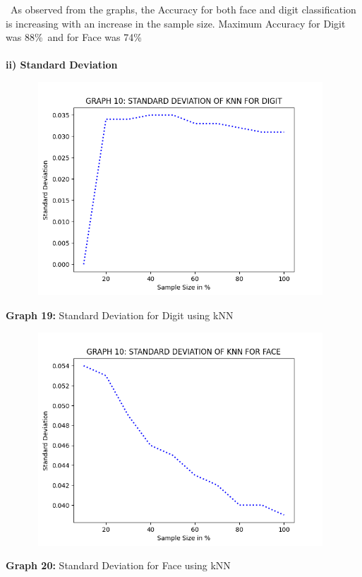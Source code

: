 \documentclass[10 pt]{report}   	%
\begin{document}
{{\begin{center}
\end{center}
\textbullet\ As observed from the graphs, the Accuracy for both face and digit classification is increasing with an increase in the sample size. Maximum Accuracy for Digit was 88\%\ and for Face was 74\%\ \\  \\
\textbf{ii) Standard Deviation}
\begin{figure} [H]
\includegraphics [width = 11cm, height = 8cm]{KNN_STD_DIGIT.png}
\end {figure}
\begin{center}
\small \textbf {Graph 19:} Standard Deviation for Digit using kNN\\
\end{center}
\begin{figure} [H]
\includegraphics [width = 11cm, height = 8cm]{KNN_STD_FACE.png}
\end {figure}
\begin{center}
\small \textbf {Graph 20:} Standard Deviation for Face using kNN\\

\end{center}}}
\end{document}
